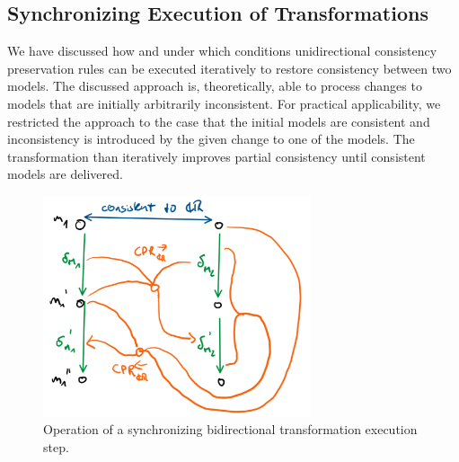 \subsection{Synchronizing Execution of Transformations}
\label{chap:synchronization:bidirectional:execution}

We have discussed how and under which conditions unidirectional consistency preservation rules can be executed iteratively to restore consistency between two models.
The discussed approach is, theoretically, able to process changes to models that are initially arbitrarily inconsistent.
For practical applicability, we restricted the approach to the case that the initial models are consistent and inconsistency is introduced by the given change to one of the models.
The transformation than iteratively improves partial consistency until consistent models are delivered.

\begin{figure}
    \centering
    \includegraphics[width=0.7\textwidth]{figures/correctness/synchronization/synchronizing_execution_step.png}    
    \caption[Synchronizing bidirectional transformation execution step]{Operation of a synchronizing bidirectional transformation execution step.}
    \label{fig:synchronization:synchronizing_execution_step}
\end{figure}

